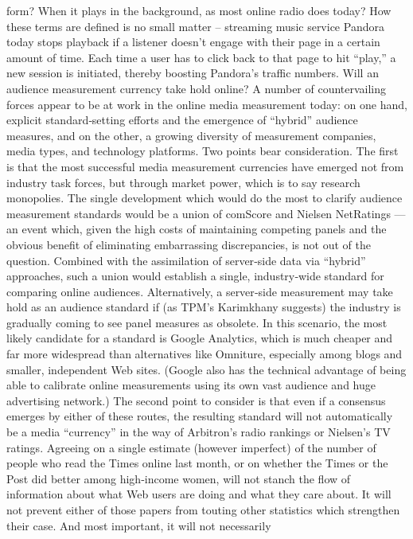 form? When it plays in the background, as most online radio does today?
How these terms are defined is no small matter – streaming music service
Pandora today stops playback if a listener doesn’t engage with their page
in a certain amount of time. Each time a user has to click back to that page
to hit ``play,'' a new session is initiated, thereby boosting Pandora’s traffic
numbers.
Will an audience measurement currency take hold online?
A number of countervailing forces appear to be at work in the online
media measurement today: on one hand, explicit standard‐setting efforts
and the emergence of ``hybrid'' audience measures, and on the other, a
growing diversity of measurement companies, media types, and
technology platforms.
Two points bear consideration. The first is that the most successful media
measurement currencies have emerged not from industry task forces, but
through market power, which is to say research monopolies. The single
development which would do the most to clarify audience measurement
standards would be a union of comScore and Nielsen NetRatings — an
event which, given the high costs of maintaining competing panels and
the obvious benefit of eliminating embarrassing discrepancies, is not out
of the question.
Combined with the assimilation of server‐side data via ``hybrid''
approaches, such a union would establish a single, industry‐wide
standard for comparing online audiences. Alternatively, a server‐side
measurement may take hold as an audience standard if (as TPM’s
Karimkhany suggests) the industry is gradually coming to see panel
measures as obsolete. In this scenario, the most likely candidate for a
standard is Google Analytics, which is much cheaper and far more
widespread than alternatives like Omniture, especially among blogs and
smaller, independent Web sites. (Google also has the technical advantage
of being able to calibrate online measurements using its own vast
audience and huge advertising network.)
The second point to consider is that even if a consensus emerges by either
of these routes, the resulting standard will not automatically be a media
``currency'' in the way of Arbitron’s radio rankings or Nielsen’s TV
ratings. Agreeing on a single estimate (however imperfect) of the number
of people who read the Times online last month, or on whether the Times
or the Post did better among high‐income women, will not stanch the flow
of information about what Web users are doing and what they care about.
It will not prevent either of those papers from touting other statistics
which strengthen their case. And most important, it will not necessarily
